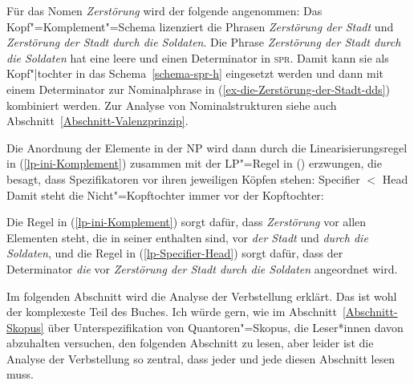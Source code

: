\noindent
Für das Nomen \emph{Zerstörung} wird der folgende \catw angenommen:
\ea
{}
\z
Das Kopf"=Komplement"=Schema lizenziert die Phrasen  \emph{Zerstörung der Stadt}
und  \emph{Zerstörung der Stadt durch die Soldaten}. Die Phrase  \emph{Zerstörung der Stadt durch
  die Soldaten} hat eine leere \compsl und einen Determinator in \textsc{spr}. Damit kann sie als
Kopf"|tochter in das Schema~\ref{schema-spr-h} eingesetzt werden und dann mit einem Determinator zur
Nominalphrase in (\ref{ex-die-Zerstörung-der-Stadt-dds}) kombiniert werden. Zur Analyse von
Nominalstrukturen siehe auch Abschnitt~\ref{Abschnitt-Valenzprinzip}.

Die Anordnung der Elemente in der NP wird dann durch die Linearisierungsregel in (\ref{lp-ini-Komplement})
zusammen mit der LP"=Regel in () erzwungen, die besagt, dass Spezifikatoren vor ihren
jeweiligen Köpfen stehen:
\ea
\label{lp-Specifier-Head}
Specifier $<$ Head
\z
Damit steht die Nicht"=Kopftochter immer vor der Kopftochter:
\ea
{}
\z

\noindent
Die Regel in (\ref{lp-ini-Komplement}) sorgt dafür, dass \emph{Zerstörung} vor allen Elementen steht, die in seiner
\compsl enthalten sind, \dash vor \emph{der Stadt} und \emph{durch die Soldaten}, und die Regel in
(\ref{lp-Specifier-Head}) sorgt dafür, dass der Determinator \emph{die} vor \emph{Zerstörung der Stadt durch die
Soldaten} angeordnet wird.

Im folgenden Abschnitt wird die Analyse der Verbstellung erklärt. Das ist wohl der komplexeste Teil
des Buches. Ich würde gern, wie im Abschnitt~\ref{Abschnitt-Skopus} über Unterspezifikation von Quantoren"=Skopus, die
Leser*innen davon abzuhalten versuchen, den folgenden Abschnitt zu lesen, aber leider ist die
Analyse der Verbstellung so zentral, dass jeder und jede diesen Abschnitt lesen muss.

